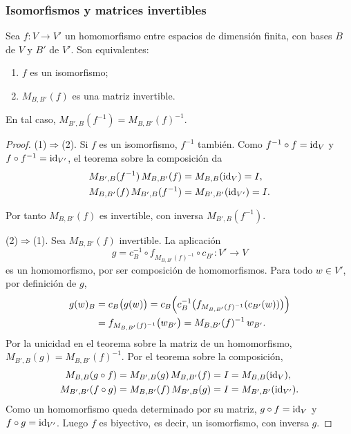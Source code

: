 \begin{frame}[allowframebreaks, t]
    \frametitle{Isomorfismos y matrices invertibles}

    \begin{proposition}
        Sea $f\colon V\to V'$ un homomorfismo entre espacios de dimensión
        finita, con bases $B$ de $V$ y $B'$ de $V'$. Son equivalentes:
        \begin{enumerate}[(1)]
            \item $f$ es un isomorfismo;
            \item $M_{B,B'}(f)$ es una matriz invertible.
        \end{enumerate}
        En tal caso, $M_{B',B}(f^{-1})=M_{B,B'}(f)^{-1}$.
    \end{proposition}

    \begin{proof}
        \alert{(1)$\Rightarrow$(2).} Si $f$ es un isomorfismo, $f^{-1}$ también. Como $f^{-1}\circ f=\operatorname{id}_V$ y $f\circ f^{-1}=\operatorname{id}_{V'}$, el teorema
        sobre la composición da
        \begin{align*}
            M_{B',B}(f^{-1})\,M_{B,B'}(f)&=M_{B,B}(\operatorname{id}_V)=I,\\
            M_{B,B'}(f)\,M_{B',B}(f^{-1})&=M_{B',B'}(\operatorname{id}_{V'})=I.
        \end{align*}

        Por tanto $M_{B,B'}(f)$ es invertible, con inversa
        $M_{B',B}(f^{-1})$.

        \alert{(2)$\Rightarrow$(1).} Sea $M_{B,B'}(f)$ invertible. La aplicación
        \[
            g=c_B^{-1}\circ f_{M_{B,B'}(f)^{-1}}\circ c_{B'}\colon V'\to V
        \]
        es un homomorfismo, por ser composición de homomorfismos. Para
        todo $w\in V'$, por definición de $g$,
        \begin{align*}
            g(w)_B&=c_B\bigl(g(w)\bigr)
            =c_B\Bigl(c_B^{-1}\bigl(f_{M_{B,B'}(f)^{-1}}(c_{B'}(w))\bigr)\Bigr)\\
            &=f_{M_{B,B'}(f)^{-1}}\bigl(w_{B'}\bigr)
            =M_{B,B'}(f)^{-1}\,w_{B'}.
        \end{align*}
        Por la unicidad en el teorema sobre la matriz de un homomorfismo,
        $M_{B',B}(g)=M_{B,B'}(f)^{-1}$. Por el teorema sobre la composición,
        \begin{align*}
            M_{B,B}(g\circ f)&=M_{B',B}(g)\,M_{B,B'}(f)=I=M_{B,B}(\operatorname{id}_V),\\
            M_{B',B'}(f\circ g)&=M_{B,B'}(f)\,M_{B',B}(g)=I=M_{B',B'}(\operatorname{id}_{V'}).
        \end{align*}
        Como un homomorfismo queda determinado por su matriz,
        $g\circ f=\operatorname{id}_V$ y $f\circ g=\operatorname{id}_{V'}$. Luego $f$ es biyectivo, es
        decir, un isomorfismo, con inversa $g$.
    \end{proof}

    

\end{frame}


